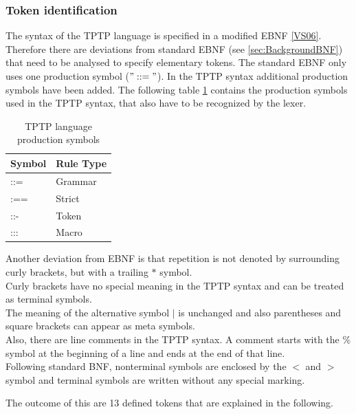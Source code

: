 \subsubsection{Token identification}\label{sec:ConceptElementaryTokens}
The syntax of the \ac{TPTP} language is specified in a modified \ac{EBNF} \ref{VS06}.
Therefore there are deviations from standard \ac{EBNF} (see \ref{sec:BackgroundBNF}) that need to be analysed to specify elementary tokens.
The standard \ac{EBNF} only uses one production symbol ($"::="$).
In the \ac{TPTP} syntax additional production symbols have been added.
The following table \ref{tbl:ConceptTPTPProductionSymbols} contains the production symbols used in the \ac{TPTP} syntax, that also have to be recognized by the lexer.
\begin{table}[H]
\centering
\renewcommand{\arraystretch}{1}
\caption{\ac{TPTP} language production symbols \cite{VS06}}
\begin{tabular}{ll}
\textbf{Symbol} & \textbf{Rule Type}\\\hline
::= & Grammar\\
:== & Strict\\
::- & Token\\
::: & Macro\\
\end{tabular}
\label{tbl:ConceptTPTPProductionSymbols}
\end{table}

Another deviation from \ac{EBNF} is that repetition is not denoted by surrounding curly brackets, but with a trailing $*$ symbol.\\
Curly brackets have no special meaning in the \ac{TPTP} syntax and can be treated as terminal symbols.\\
The meaning of the alternative symbol $|$ is unchanged and also parentheses and square brackets can appear as meta symbols.\\
Also, there are line comments in the \ac{TPTP} syntax.
A comment starts with the $\%$ symbol at the beginning of a line and ends at the end of that line.\\
Following standard \ac {BNF}, nonterminal symbols are enclosed by the $<$ and $>$ symbol and terminal symbols are written without any special marking.

 



The outcome of this are 13 defined tokens that are explained in the following.

